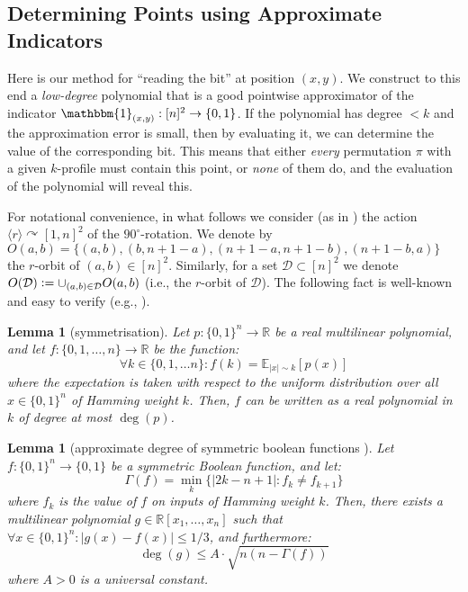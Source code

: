 \documentclass{article}
\newtheorem{lemma}[theorem]{Lemma}
\newcommand{\RR}{\mathbb{R}}
\newcommand{\E}{\mathbb{E}}
\newcommand{\eqdef}{\vcentcolon=}
\theoremstyle{remark}
\def\acts{\curvearrowright}
\theoremstyle{plain}
\begin{document}
\subsection{Determining Points using Approximate Indicators}
\label{subsect:approx_indicators_and_points}

Here is our method for ``reading the bit'' at position $(x,y)$. We construct
to this end a \emph{low-degree} polynomial that is a good 
pointwise approximator of the indicator $\mathbbm{1}_{(x,y)}: [n]^2 \to \{0,1\}$.
If the polynomial has degree $<k$ and the approximation error is small, then by
evaluating it, we can determine the value of the corresponding bit. This means that either
\emph{every} permutation $\pi$ with a given $k$-profile must contain this point,
or \emph{none} of them do, and the evaluation of the polynomial will reveal this. 

For notational convenience, in what follows we consider 
(as in ) the action 
$\langle r \rangle \acts [1,n]^2$ of the $90^\circ$-rotation. We denote by 
$O(a,b) = \{ (a,b), (b, n+1-a), (n+1-a, n+1-b), (n+1-b, a)\}$ the $r$-orbit of 
$(a,b) \in [n]^2$. Similarly, for a set $\mathcal{D} \subset [n]^2$ we denote $O(\mathcal{D}) \eqdef \cup_{(a,b) \in \mathcal{D}} O(a,b)$ (i.e., the $r$-orbit of $\mathcal{D}$). The following fact is well-known and easy to verify (e.g., \cite{minsky1969perceptron}). 

\begin{lemma}[symmetrisation]
    \label{lemma:mp_sym}
    Let $p : \{0,1\}^n \to \RR$ be a real multilinear polynomial, and let $f: \{0, 1, \dots, n\} \to \RR$ be the function:
    \[
        \forall k \in \{0,1, \dots n\}: f(k) = \E_{|x| \sim k}[p(x)]
    \]
    where the expectation is taken with respect to the uniform distribution over all $x \in \{0,1\}^n$ of Hamming weight $k$. Then, $f$ can be written as a real polynomial in $k$ of degree at most $\deg(p)$.
\end{lemma}

\begin{lemma}[approximate degree of symmetric boolean functions \cite{paturi1992degree}]
    \label{lemma:apx_deg_sym}
    Let $f: \{0,1\}^n \to \{0,1\}$ be a symmetric Boolean function, and let:
    \[
        \Gamma(f) = \min_k \{ |2k - n + 1| : f_{k} \ne f_{k+1} \}
    \]
    where $f_k$ is the value of $f$ on inputs of Hamming weight $k$. Then, there exists a multilinear polynomial $g \in \RR[x_1, \dots, x_n]$ such that $\forall x \in \{0,1\}^n: |g(x) - f(x)| \le 1/3$, and furthermore:
    \[
        \deg(g) \le A \cdot \sqrt{n \left( n - \Gamma(f) \right) }
    \]
    where $A > 0$ is a universal constant. 
\end{lemma}
\end{document}

